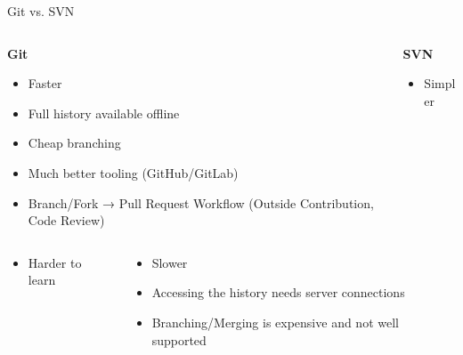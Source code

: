 \begin{frame}[t]{Git vs. SVN}

  \begin{columns}[t, onlytextwidth]
    \begin{column}{0.475\textwidth}
      \textbf{\Large Git}
      \begin{itemize}
        \item Faster
        \item Full history available offline
        \item Cheap branching
        \item Much better tooling (GitHub/GitLab)
        \item Branch/Fork → Pull Request Workflow (Outside Contribution, Code Review)
      \end{itemize} 
    \end{column}
    \hfill
    \begin{column}{0.475\textwidth}
      \textbf{\Large SVN}
      \begin{itemize}
        \item Simpler
      \end{itemize} 
    \end{column}
  \end{columns}

  \begin{columns}[t, onlytextwidth]
    \begin{column}{0.475\textwidth}
      \begin{itemize}
        \item Harder to learn
      \end{itemize} 
    \end{column}
    \hfill
    \begin{column}{0.475\textwidth}
      \begin{itemize}
        \item Slower
        \item Accessing the history needs server connections
        \item Branching/Merging is expensive and not well supported
      \end{itemize} 
    \end{column}
  \end{columns}
\end{frame}
